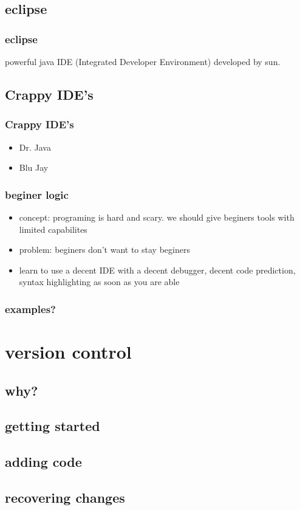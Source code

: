 \documentclass[hyperref={pdfpagelabels=false}]{beamer}
\begin{document}
\subsection{eclipse}
\frame
{
    \frametitle{eclipse}
    powerful java IDE (Integrated Developer Environment) developed by sun.
}
\subsection{Crappy IDE's}
\frame
{
    \frametitle{Crappy IDE's}
    \begin{itemize}
    \item{Dr. Java}
    \item{Blu Jay}
    \end{itemize}
}
\frame
{
    \frametitle{beginer logic}
    \begin{itemize}
    \item{concept: programing is hard and scary. we should give beginers tools with limited capabilites}
    \item{problem: beginers don't want to stay beginers}
    \item{learn to use a decent IDE with a decent debugger, decent code prediction, syntax highlighting as soon as you are able}
    \end{itemize}
}
\frame
{
    \frametitle{examples?}
}
\section{version control}
\subsection{why?}
\subsection{getting started}
\subsection{adding code}
\subsection{recovering changes}
\end{document}
